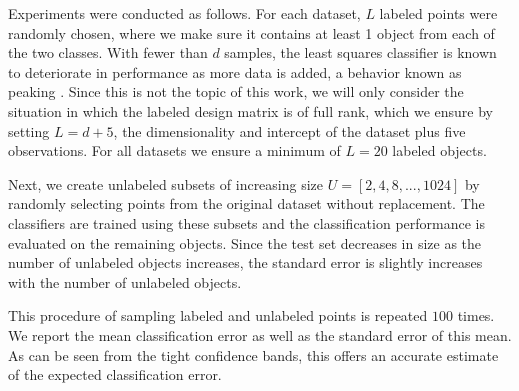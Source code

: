 \documentclass{llncs}
\newcommand{\featdim}{d}
\newcommand{\Nunl}{U}
\newcommand{\Nlab}{L}
\begin{document}
Experiments were conducted as follows. For each dataset, $\Nlab$ labeled points were randomly chosen, where we make sure it contains at least 1 object from each of the two classes.  With fewer than $\featdim$ samples, the least squares classifier is known to deteriorate in performance as more data is added, a behavior known as peaking \cite{Raudys1998,Opper1996}. Since this is not the topic of this work, we will only consider the situation in which the labeled design matrix is of full rank, which we ensure by setting $\Nlab=\featdim+5$, the dimensionality and intercept of the dataset plus five observations. For all datasets we ensure a minimum of $\Nlab=20$ labeled objects.

Next, we create unlabeled subsets of increasing size $\Nunl=[2,4,8,...,1024]$ by randomly selecting points from the original dataset without replacement. The classifiers are trained using these subsets and the classification performance is evaluated on the remaining objects. Since the test set decreases in size as the number of unlabeled objects increases, the standard error is slightly increases with the number of unlabeled objects.

This procedure of sampling labeled and unlabeled points is repeated $100$ times. We report the mean classification error as well as the standard error of this mean. As can be seen from the tight confidence bands, this offers an accurate estimate of the expected classification error.

\end{document}
